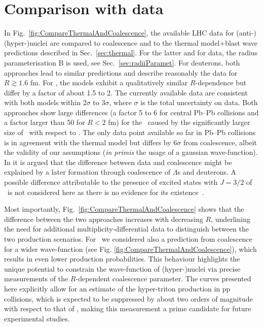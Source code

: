 \documentclass[%
 reprint,
 amsmath,amssymb,
 aps,
]{revtex4-1}
\begin{document}
\section{Comparison with data}
In Fig.~\ref{fig:CompareThermalAndCoalescence}, the available LHC data for (anti-)(hyper-)nuclei \cite{ALICE:nucleipp2017, ALICE:deuteronppPbPb2015, Adam:2015yta} are compared to coalescence and to the thermal model+blast wave predictions described in Sec.~\ref{sec:thermal}.
For the latter and for data, the radius parameterisation B is used, see Sec.~\ref{sec:radiiParamet}. 
For deuterons, both approaches lead to similar predictions and describe reasonably the data for $R \gtrsim 1.6$ fm. 
For \hethree, the models exhibit a qualitatively similar $R$-dependence but differ by a factor of about 1.5 to 2. 
The currently available data are consistent with both models within 2$\sigma$ to 3$\sigma$, where $\sigma$ is the total uncertainty on data. 
Both approaches show large differences (a factor 5 to 6 for central Pb--Pb collisions and a factor larger than 50 for $R < 2$ fm) for the \hthreelambda\ caused by the significantly larger size of \hthreelambda\ with respect to \hethree. 
The only data point available so far in Pb--Pb collisions is in agreement with the thermal model but differs by 6$\sigma$ from coalescence, albeit the validity of our assumptions (\textit{in primis} the usage of a gaussian wave-function).
In \cite{Zhang:2018euf} it is argued that the difference between data and coalescence might be explained by a later formation through coalescence of $\Lambda$s and deuterons. 
A possible difference attributable to the presence of excited states with $J=3/2$ of \hthreelambda~is not considered here as there is no evidence for its existence~\cite{Mart:1996ay}. 

Most importantly, Fig.~\ref{fig:CompareThermalAndCoalescence} shows that the difference between the two approaches increases with decreasing $R$, underlining the need for additional multiplicity-differential data to distinguish between the two production scenarios. 
For \hthreelambda~we considered also a prediction from coalescence for a wider wave-function (see Fig. \ref{fig:CompareThermalAndCoalescence}), which results in even lower production probabilities. This behaviour highlights the unique potential to constrain the wave-function of (hyper-)nuclei via precise measurements of the $R$-dependent coalescence parameter. 
The curves presented here explicitly allow for an estimate of the hyper-triton production in pp collisions, which is expected to be suppressed by about two orders of magnitude with respect to that of \hethree, making this measurement a prime candidate for future experimental studies.
\end{document}
